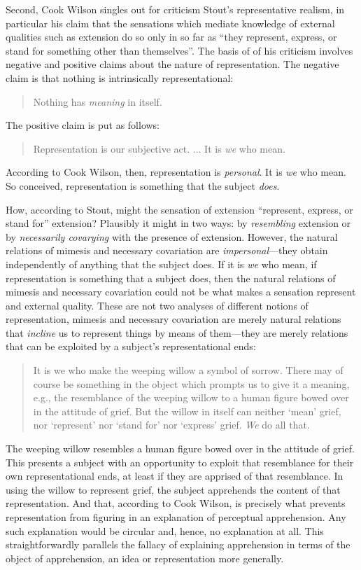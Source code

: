 \documentclass[11pt]{article}
\begin{document}
Second, Cook Wilson singles out for criticism Stout’s representative realism, in particular his claim that the sensations which mediate knowledge of external qualities such as extension do so only in so far as ``they represent, express, or stand for something other than themselves''. The basis of of his criticism involves negative and positive claims about the nature of representation. The negative claim is that nothing is intrinsically representational:
\begin{quote}
	Nothing has \emph{meaning} in itself. \citep[]{Cook-Wilson:1926sf}
\end{quote}
The positive claim is put as follows: 
\begin{quote}
	Representation is our subjective act. ... It is \emph{we} who mean.  \citep[]{Cook-Wilson:1926sf}
\end{quote}
According to Cook Wilson, then, representation is \emph{personal}. It is \emph{we} who mean. So conceived, representation is something that the subject \emph{does}. 

How, according to Stout, might the sensation of extension ``represent, express, or stand for'' extension? Plausibly it might in two ways: by \emph{resembling} extension or by \emph{necessarily covarying} with the presence of extension. However, the natural relations of mimesis and necessary covariation are \emph{impersonal}---they obtain independently of anything that the subject does. If it is \emph{we} who mean, if representation is something that a subject does, then the natural relations of mimesis and necessary covariation could not be what makes a sensation represent and external quality. These are not two analyses of different notions of representation, mimesis and necessary covariation are merely natural relations that \emph{incline} us to represent things by means of them---they are merely relations that can be exploited by a subject's representational ends:
\begin{quote}
	It is we who make the weeping willow a symbol of sorrow. There may of course be something in the object which prompts us to give it a meaning, e.g., the resemblance of the weeping willow to a human figure bowed over in the attitude of grief. But the willow in itself can neither `mean' grief, nor `represent' nor `stand for' nor `express' grief. \emph{We} do all that.  \citep[770]{Cook-Wilson:1926sf}
\end{quote}
The weeping willow resembles a human figure bowed over in the attitude of grief. This presents a subject with an opportunity to exploit that resemblance for their own representational ends, at least if they are apprised of that resemblance. In using the willow to represent grief, the subject apprehends the content of that representation. And that, according to Cook Wilson, is precisely what prevents representation from figuring in an explanation of perceptual apprehension. Any such explanation would be circular and, hence, no explanation at all. This straightforwardly parallels the fallacy of explaining apprehension in terms of the object of apprehension, an idea or representation more generally.
\end{document}
